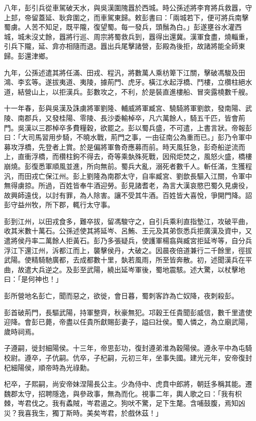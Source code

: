 \begin{pinyinscope}
八年，彭引兵從車駕破天水，與吳漢圍隗囂於西城。時公孫述將李育將兵救囂，守上邽，帝留蓋延、耿弇圍之，而車駕東歸。敕彭書曰：「兩城若下，便可將兵南擊蜀虜。人苦不知足，既平隴，復望蜀。每一發兵，頭鬚為白。」彭遂壅谷水灌西城，城未沒丈餘，囂將行巡、周宗將蜀救兵到，囂得出還冀。漢軍食盡，燒輜重，引兵下隴，延、弇亦相隨而退。囂出兵尾擊諸營，彭殿為後拒，故諸將能全師東歸。彭還津鄉。

九年，公孫述遣其將任滿、田戎、程汎，將數萬人乘枋箄下江關，擊破馮駿及田鴻、李玄等。遂拔夷道、夷陵，據荊門、虎牙。橫江水起浮橋、鬥樓，立欑柱絕水道，結營山上，以拒漢兵。彭數攻之，不利，於是裝直進樓船、冒突露橈數千艘。

十一年春，彭與吳漢及誅虜將軍劉隆、輔威將軍臧宮、驍騎將軍劉歆，發南陽、武陵、南郡兵，又發桂陽、零陵、長沙委輸棹卒，凡六萬餘人，騎五千匹，皆會荊門。吳漢以三郡棹卒多費糧穀，欲罷之。彭以蜀兵盛，不可遣，上書言狀。帝報彭曰：「大司馬習用步騎，不曉水戰，荊門之事，一由征南公為重而已。」彭乃令軍中募攻浮橋，先登者上賞。於是偏將軍魯奇應募而前。時天風狂急，彭奇船逆流而上，直衝浮橋，而欑柱鉤不得去，奇等乘埶殊死戰，因飛炬焚之，風怒火盛，橋樓崩燒。彭復悉軍順風並進，所向無前。蜀兵大亂，溺死者數千人。斬任滿，生獲程汎，而田戎亡保江州。彭上劉隆為南郡太守，自率臧宮、劉歆長驅入江關，令軍中無得虜掠。所過，百姓皆奉牛酒迎勞。彭見諸耆老，為言大漢哀愍巴蜀久見虜役，故興師遠伐，以討有罪，為人除害。讓不受其牛酒。百姓皆大喜悅，爭開門降。詔彭守益州牧，所下郡，輒行太守事。

彭到江州，以田戎食多，難卒拔，留馮駿守之，自引兵乘利直指墊江，攻破平曲，收其米數十萬石。公孫述使其將延岑、呂鮪、王元及其弟恢悉兵拒廣漢及資中，又遣將侯丹率二萬餘人拒黃石。彭乃多張疑兵，使護軍楊翕與臧宮拒延岑等，自分兵浮江下還江州，泝都江而上，襲擊侯丹，大破之。因晨夜倍道兼行二千餘里，徑拔武陽。使精騎馳廣都，去成都數十里，埶若風雨，所至皆奔散。初，述聞漢兵在平曲，故遣大兵逆之。及彭至武陽，繞出延岑軍後，蜀地震駭。述大驚，以杖擊地曰：「是何神也！」

彭所營地名彭亡，聞而惡之，欲徙，會日暮，蜀刺客詐為亡奴降，夜刺殺彭。

彭首破荊門，長驅武陽，持軍整齊，秋豪無犯。邛穀王任貴聞彭威信，數千里遣使迎降。會彭已薨，帝盡以任貴所獻賜彭妻子，謚曰壯侯。蜀人憐之，為立廟武陽，歲時祠焉。

子遵嗣，徙封細陽侯。十三年，帝思彭功，復封遵弟淮為穀陽侯。遵永平中為屯騎校尉。遵卒，子伉嗣。伉卒，子杞嗣，元初三年，坐事失國。建光元年，安帝復封杞細陽侯，順帝時為光祿勳。

杞卒，子熙嗣，尚安帝妹涅陽長公主。少為侍中、虎賁中郎將，朝廷多稱其能。遷魏郡太守，招聘隱逸，與參政事，無為而化。視事二年，輿人歌之曰：「我有枳棘，岑君伐之。我有蟊賊，岑君遏之。狗吠不驚，足下生氂。含哺鼓腹，焉知凶災？我喜我生，獨丁斯時。美矣岑君，於戲休茲！」


\end{pinyinscope}
